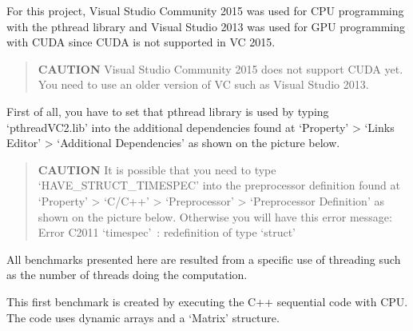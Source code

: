 \documentclass[]{article}
\begin{document}

For this project, Visual Studio Community 2015 was used for CPU
programming with the pthread library and Visual Studio 2013 was used for
GPU programming with CUDA since CUDA is not supported in VC 2015.

\begin{quote}
\textbf{CAUTION} Visual Studio Community 2015 does not support CUDA yet.
You need to use an older version of VC such as Visual Studio 2013.
\end{quote}

First of all, you have to set that pthread library is used by typing
`pthreadVC2.lib' into the additional dependencies found at `Property'
\textgreater{} `Links Editor' \textgreater{} `Additional Dependencies'
as shown on the picture below.

\begin{quote}
\textbf{CAUTION} It is possible that you need to type
`HAVE\_STRUCT\_TIMESPEC' into the preprocessor definition found at
`Property' \textgreater{} `C/C++' \textgreater{} `Preprocessor'
\textgreater{} `Preprocessor Definition' as shown on the picture below.
Otherwise you will have this error message: Error C2011 `timespec'~:
redefinition of type `struct'
\end{quote}


All benchmarks presented here are resulted from a specific use of
threading such as the number of threads doing the computation.


This first benchmark is created by executing the C++ sequential code
with CPU. The code uses dynamic arrays and a `Matrix' structure.
\end{document}
